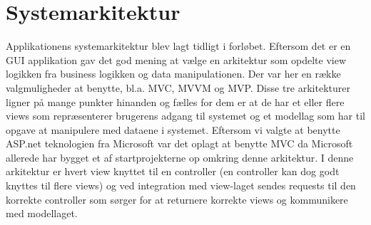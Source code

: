 \section{Systemarkitektur}

Applikationens systemarkitektur blev lagt tidligt i forløbet. Eftersom det er en GUI applikation gav det god mening at vælge en arkitektur som opdelte view logikken fra business logikken og data manipulationen. Der var her en række valgmuligheder at benytte, bl.a. MVC, MVVM og MVP. Disse tre arkitekturer ligner på mange punkter hinanden og fælles for dem er at de har et eller flere views som repræsenterer brugerens adgang til systemet og et modellag som har til opgave at manipulere med dataene i systemet. Eftersom vi valgte at benytte ASP.net teknologien fra Microsoft var det oplagt at benytte MVC da Microsoft allerede har  bygget et af startprojekterne op omkring denne arkitektur. I denne arkitektur er hvert view knyttet til en controller (en controller kan dog godt knyttes til flere views) og ved integration med view-laget sendes requests til den korrekte controller som sørger for at returnere korrekte views og kommunikere med modellaget. 